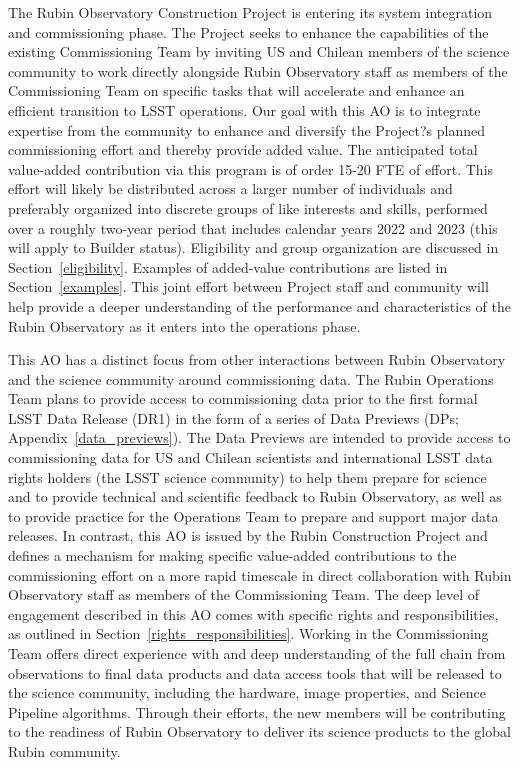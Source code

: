 \documentclass[SE,authoryear,toc,lsstdraft]{lsstdoc}
\begin{document}
The Rubin Observatory Construction Project is entering its system integration and commissioning phase. The Project seeks to enhance the capabilities of the existing Commissioning Team by inviting US and Chilean members of the science community to work directly alongside Rubin Observatory staff as members of the Commissioning Team on specific tasks that will accelerate and enhance an efficient transition to LSST operations. Our goal with this AO is to integrate expertise from the community to enhance and diversify the Project?s planned commissioning effort and thereby provide added value. The anticipated total value-added contribution via this program is of order 15-20 FTE of effort. This effort will likely be distributed across a larger number of individuals and preferably organized into discrete groups of like interests and skills, performed over a roughly two-year period that includes calendar years 2022 and 2023 (this will apply to Builder status). Eligibility and group organization are discussed in Section~\ref{eligibility}. Examples of added-value contributions are listed in Section~\ref{examples}. This joint effort between Project staff and community will help provide a deeper understanding of the performance and characteristics of the Rubin Observatory as it enters into the operations phase.

This AO has a distinct focus from other interactions between Rubin Observatory and the science community around commissioning data. The Rubin Operations Team plans to provide access to commissioning data prior to the first formal LSST Data Release (DR1) in the form of a series of Data Previews (DPs; Appendix~\ref{data_previews}). The Data Previews are intended to provide access to commissioning data for US and Chilean scientists and international LSST data rights holders (the LSST science community) to help them prepare for science and to provide technical and scientific feedback to Rubin Observatory, as well as to provide practice for the Operations Team to prepare and support major data releases. In contrast, this AO is issued by the Rubin Construction Project and defines a mechanism for making specific value-added contributions to the commissioning effort on a more rapid timescale in direct collaboration with Rubin Observatory staff as members of the Commissioning Team. The deep level of engagement described in this AO comes with specific rights and responsibilities, as outlined in Section~\ref{rights_responsibilities}. Working in the Commissioning Team offers direct experience with and deep understanding of the full chain from observations to final data products and data access tools that will be released to the science community, including the hardware, image properties, and Science Pipeline algorithms. Through their efforts, the new members will be contributing to the readiness of Rubin Observatory to deliver its science products to the global Rubin community. 
\end{document}
